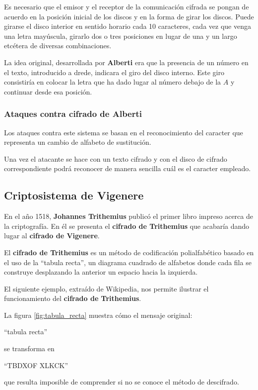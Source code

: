 \documentclass[nochap]{apuntesURJC}
\begin{document}
Es necesario que el emisor y el receptor de la comunicación cifrada se pongan de acuerdo en la posición inicial de los discos y en la forma de girar los discos. Puede girarse el disco interior en sentido horario cada 10 caracteres, cada vez que venga una letra mayúscula, girarlo dos o tres posiciones en lugar de una y un largo etcétera de diversas combinaciones.

La idea original, desarrollada por \textbf{Alberti} era que la presencia de un número en el texto, introducido a drede, indicara el giro del disco interno. Este giro consistiría en colocar la letra que ha dado lugar al número debajo de la $A$ y continuar desde esa posición.

\subsubsection{Ataques contra cifrado de Alberti}

Los ataques contra este sistema se basan en el reconocimiento del caracter que representa un cambio de alfabeto de sustitución.

Una vez el atacante se hace con un texto cifrado y con el disco de cifrado correspondiente podrá reconocer de manera sencilla cuál es el caracter empleado.

\subsection{Criptosistema de Vigenere}
En el año 1518, \textbf{Johannes Trithemius} publicó el primer libro impreso acerca de la criptografía. En él se presenta el \textbf{cifrado de Trithemius} que acabaría dando lugar al \textbf{cifrado de Vigenere}.

El \textbf{cifrado de Trithemius} es un método de codificación polialfabético basado en el uso de la ``tabula recta'', un diagrama cuadrado de alfabetos donde cada fila se construye desplazando la anterior un espacio hacia la izquierda.

El siguiente ejemplo, extraído de Wikipedia, nos permite ilustrar el funcionamiento del \textbf{cifrado de Trithemius}.

La figura \ref{fig:tabula_recta} muestra cómo el mensaje original:
\begin{center}
``tabula recta''
\end{center}
se transforma en
\begin{center}
``TBDXOF XLKCK''
\end{center}
que resulta imposible de comprender si no se conoce el método de descifrado.
\end{document}

